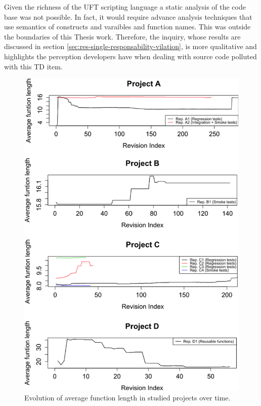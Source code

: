     Given the richness of the UFT scripting language a static analysis of the code base was not possible. In fact, it would require advance analysis techniques that use semantics of constructs and varaibles  and function names. This was outside the boundaries of this Thesis work. Therefore, the inquiry, whose results are discussed in section \ref{sec:res-single-responsability-vilation}, is more qualitative and highlights the perception developers have when dealing with source code polluted with this TD item.

\begin{figure}[!htbp]
    \centering
    \includegraphics[width=\textwidth,keepaspectratio]{figure/results/rq1/avg-length-together.pdf}
    \caption{Evolution of average function length in studied projects over time.}
    \label{fig:avg-length-together}
\end{figure}


